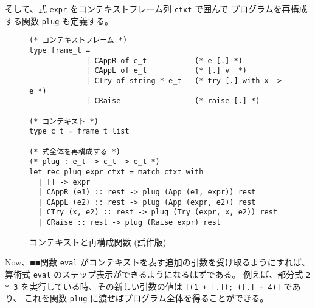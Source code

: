 そして、式 \texttt{expr} をコンテキストフレーム列 \texttt{ctxt} で囲んで
プログラムを再構成する関数 \texttt{plug} も定義する。

\begin{figure}
\begin{spacing}{0.8}
\begin{verbatim}
(* コンテキストフレーム *)
type frame_t = 
             | CAppR of e_t           (* e [.] *)
             | CAppL of e_t           (* [.] v  *)
             | CTry of string * e_t   (* try [.] with x -> e *)
             | CRaise                 (* raise [.] *)

(* コンテキスト *)
type c_t = frame_t list

(* 式全体を再構成する *)
(* plug : e_t -> c_t -> e_t *)
let rec plug expr ctxt = match ctxt with
  | [] -> expr
  | CAppR (e1) :: rest -> plug (App (e1, expr)) rest
  | CAppL (e2) :: rest -> plug (App (expr, e2)) rest
  | CTry (x, e2) :: rest -> plug (Try (expr, x, e2)) rest
  | CRaise :: rest -> plug (Raise expr) rest
\end{verbatim}
\end{spacing}
\caption{コンテキストと再構成関数 (試作版)}
\label{figure:simpleplug}
\end{figure}

Now、■■関数 \texttt{eval} がコンテキストを表す追加の引数を受け取るようにすれば、
算術式 \texttt{eval} のステップ表示ができるようになるはずである。
例えば、部分式 \texttt{2 * 3} を実行している時、その新しい引数の値は
\texttt{[(1 + [.]);\ ([.]\ + 4)]} であり、
これを関数 \texttt{plug} に渡せばプログラム全体を得ることができる。

